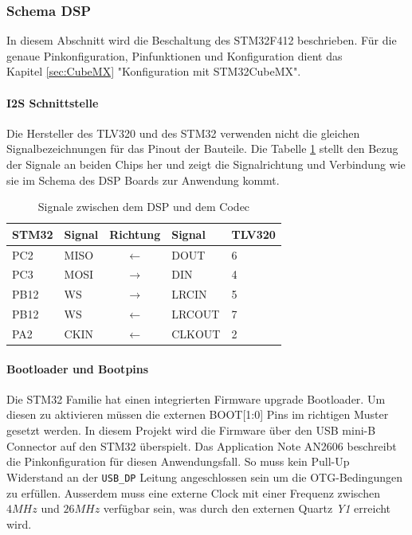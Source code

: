 \subsubsection{Schema DSP}
\label{sec:Schema_DSP}

In diesem Abschnitt wird die Beschaltung des STM32F412 beschrieben. Für die genaue Pinkonfiguration, Pinfunktionen und Konfiguration dient das \\
Kapitel \ref{sec:CubeMX} "Konfiguration mit STM32CubeMX".

\paragraph{I2S Schnittstelle}

Die Hersteller des TLV320 und des STM32 verwenden nicht die gleichen Signalbezeichnungen für das Pinout der Bauteile.
Die Tabelle \ref{tab:I2SPins} stellt den Bezug der Signale an beiden Chips her und zeigt die Signalrichtung und Verbindung wie sie im Schema des DSP Boards zur Anwendung kommt.

\begin{table}[H]
	\centering
	\begin{tabular}{|l|l|c|l|l|}
	\hline
	\textbf{STM32} & \textbf{Signal} & \textbf{Richtung}         & \textbf{Signal} & \textbf{TLV320} \\ \hline
	PC2            & MISO            & $\leftarrow$  & DOUT            & 6               \\ \hline
	PC3            & MOSI            & $\rightarrow$ & DIN             & 4               \\ \hline
	PB12           & WS              & $\rightarrow$ & LRCIN           & 5               \\ \hline
	PB12           & WS              & $\leftarrow$  & LRCOUT          & 7               \\ \hline
	PA2            & CKIN            & $\leftarrow$  & CLKOUT          & 2               \\ \hline
	\end{tabular}
	\caption{Signale zwischen dem DSP und dem Codec}
	\label{tab:I2SPins}
\end{table}


\paragraph{Bootloader und Bootpins}

Die STM32 Familie hat einen integrierten Firmware upgrade Bootloader.
Um diesen zu aktivieren müssen die externen BOOT[1:0] Pins im richtigen Muster gesetzt werden.
In diesem Projekt wird die Firmware über den USB mini-B Connector auf den STM32 überspielt.
Das Application Note AN2606 \cite[p.136]{AN2606} beschreibt die Pinkonfiguration für diesen Anwendungsfall.
So muss kein Pull-Up Widerstand an der \texttt{USB\_DP} Leitung angeschlossen sein um die OTG-Bedingungen zu erfüllen.
Ausserdem muss eine externe Clock mit einer Frequenz zwischen $4\si{MHz}$ und $26\si{MHz}$ verfügbar sein, was durch den externen Quartz \textit{Y1} erreicht wird.

